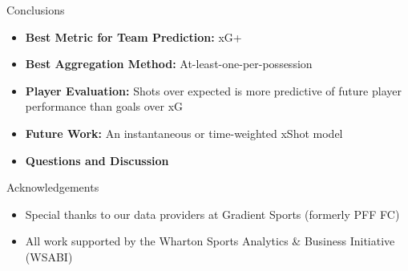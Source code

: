 \documentclass{beamer}
\begin{document}
\begin{frame}{Conclusions}
\begin{itemize}
\item \textbf{Best Metric for Team Prediction:} xG+
\item \textbf{Best Aggregation Method:} At-least-one-per-possession
\item \textbf{Player Evaluation:} Shots over expected is more predictive of future player performance than goals over xG
\item \textbf{Future Work:} An instantaneous or time-weighted xShot model
\item \textbf{Questions and Discussion}
\end{itemize}
\end{frame}

\begin{frame}{Acknowledgements}
\begin{itemize}
\item Special thanks to our data providers at Gradient Sports (formerly PFF FC)
\item All work supported by the Wharton Sports Analytics \& Business Initiative (WSABI)
\end{itemize}
\end{frame}
\end{document}
